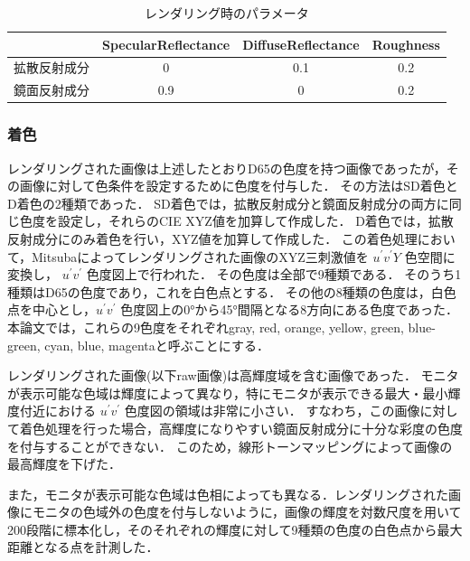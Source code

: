             \begin{table}[h]
                \centering
                \caption{レンダリング時のパラメータ}
                \begin{tabular}{|l||c|c|c|} \hline
                                           & SpecularReflectance & DiffuseReflectance & Roughness \\ \hline \hline
                    拡散反射成分           & 0                   & 0.1                & 0.2 \\ \hline
                    鏡面反射成分           & 0.9                 & 0                  & 0.2 \\ \hline
                \end{tabular}
            \end{table}
        
        \subsubsection{着色}

            レンダリングされた画像は上述したとおりD65の色度を持つ画像であったが，その画像に対して色条件を設定するために色度を付与した．
            その方法はSD着色とD着色の2種類であった．
            SD着色では，拡散反射成分と鏡面反射成分の両方に同じ色度を設定し，それらのCIE XYZ値を加算して作成した．
            D着色では，拡散反射成分にのみ着色を行い，XYZ値を加算して作成した．
            この着色処理において，Mitsubaによってレンダリングされた画像のXYZ三刺激値を $u^{\prime}v^{\prime}Y$ 色空間に変換し， $u^{\prime}v^{\prime}$ 色度図上で行われた．
            その色度は全部で9種類である．
            そのうち1種類はD65の色度であり，これを白色点とする．
            その他の8種類の色度は，白色点を中心とし，$u^{\prime}v^{\prime}$ 色度図上の0°から45°間隔となる8方向にある色度であった．
            本論文では，これらの9色度をそれぞれgray, red, orange, yellow, green, blue-green, cyan, blue, magentaと呼ぶことにする．

            レンダリングされた画像(以下raw画像)は高輝度域を含む画像であった．
            モニタが表示可能な色域は輝度によって異なり，特にモニタが表示できる最大・最小輝度付近における $u^{\prime}v^{\prime}$ 色度図の領域は非常に小さい．
            すなわち，この画像に対して着色処理を行った場合，高輝度になりやすい鏡面反射成分に十分な彩度の色度を付与することができない．
            このため，線形トーンマッピングによって画像の最高輝度を下げた．

            また，モニタが表示可能な色域は色相によっても異なる．レンダリングされた画像にモニタの色域外の色度を付与しないように，画像の輝度を対数尺度を用いて200段階に標本化し，そのそれぞれの輝度に対して9種類の色度の白色点から最大距離となる点を計測した．


